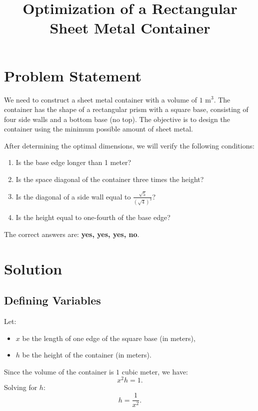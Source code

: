 \documentclass{article}
\begin{document}
\title{Optimization of a Rectangular Sheet Metal Container}
\author{}
\date{}
\maketitle

\section{Problem Statement}
We need to construct a sheet metal container with a volume of \(1 \text{ m}^3\). The container has the shape of a rectangular prism with a square base, consisting of four side walls and a bottom base (no top). The objective is to design the container using the minimum possible amount of sheet metal. 

After determining the optimal dimensions, we will verify the following conditions:
\begin{enumerate}
    \item Is the base edge longer than 1 meter?
    \item Is the space diagonal of the container three times the height?
    \item Is the diagonal of a side wall equal to \( \frac{\sqrt{5}}{(\sqrt{4})^3} \)?
    \item Is the height equal to one-fourth of the base edge?
\end{enumerate}

The correct answers are: \textbf{yes, yes, yes, no}.

\section{Solution}

\subsection{Defining Variables}
Let:
\begin{itemize}
    \item \( x \) be the length of one edge of the square base (in meters),
    \item \( h \) be the height of the container (in meters).
\end{itemize}
Since the volume of the container is \(1\) cubic meter, we have:
\begin{equation}
    x^2 h = 1.
    \label{eq:volume}
\end{equation}
Solving for \( h \):
\begin{equation}
    h = \frac{1}{x^2}.
    \label{eq:h}
\end{equation}
\end{document}
